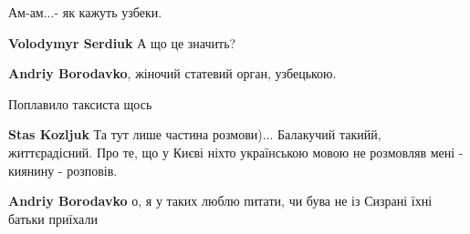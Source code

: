 \begin{itemize}
Ам-ам...- як кажуть узбеки.

\begin{itemize}
 
\textbf{Volodymyr Serdiuk}
А що це значить?

 
\textbf{Andriy Borodavko}, жіночий статевий орган, узбецькою.
\end{itemize}

 
Поплавило таксиста щось

\begin{itemize}
 
\textbf{Stas Kozljuk}
Та тут лише частина розмови)...
Балакучий такийй, життєрадісний.
Про те, що у Києві ніхто українською мовою не розмовляв мені - киянину - розповів.

 
\textbf{Andriy Borodavko} о, я у таких люблю питати, чи бува не із Сизрані їхні батьки приїхали

 

\end{itemize}
\end{itemize}
